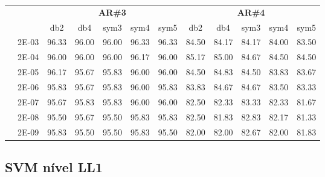 \begin{table}[H]
\begin{tabular}{|c|c|c c c c c|c c c c c|}
\cline{3-12}
\multicolumn{2}{c}{} & \multicolumn{5}{|c|}{\textbf{AR\#3}}  & \multicolumn{5}{c|}{\textbf{AR\#4}} \\\cline{3-12}
\multicolumn{2}{c}{}  & \multicolumn{1}{|c}{db2} & db4 & sym3 & sym4 & sym5 & db2 & db4& sym3 & sym4 & sym5 \\\hline
\multicolumn{1}{|c|}{ \multirow{6}{*}{\rotatebox[origin=c]{90}{\textbf{Gamma}}} }
&2E-03&	96.33&	96.00&	96.00&	96.33&	96.33&	84.50&	84.17&	84.17&	84.00&	83.50	\\\cline{2-12}
&2E-04&	96.00&	96.00&	96.00&	96.17&	96.00&	85.17&	85.00&	84.67&	84.50&	84.50	\\\cline{2-12}
&2E-05&	96.17&	95.67&	95.83&	96.00&	96.00&	84.50&	84.83&	84.50&	83.83&	83.67	\\\cline{2-12}
&2E-06&	95.83&	95.67&	95.83&	96.00&	95.83&	83.83&	84.67&	84.67&	83.50&	83.33	\\\cline{2-12}
&2E-07&	95.67&	95.83&	95.83&	96.00&	96.00&	82.50&	82.33&	83.33&	82.33&	81.67	\\\cline{2-12}
&2E-08&	95.50&	95.67&	95.50&	95.83&	95.83&	82.50&	81.83&	82.83&	82.17&	81.33	\\\cline{2-12}
&2E-09&	95.83&	95.50&	95.50&	95.83&	95.50&	82.00&	82.00&	82.67&	82.00&	81.83	
	

	
\\\midrule
\end{tabular}

\end{table}


\subsection{SVM nível LL1}

